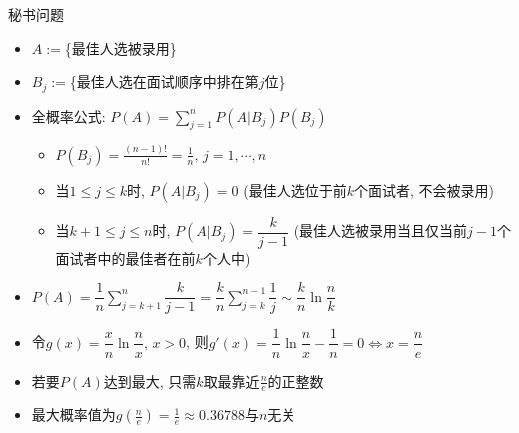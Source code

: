 \begin{frame}{秘书问题}
		\begin{itemize}[<+-|alert@+>]
			\item $A:=$\{最佳人选被录用\}%
			\item$B_j:=$\{最佳人选在面试顺序中排在第$j$位\}
			\item 全概率公式: $P(A)=\sum\limits_{j=1}^{n}P(A|B_j)P(B_j)$%
			\begin{itemize}[<+-|alert@+>]
			\item $P(B_j)=\frac{(n-1)!}{n!}=\frac{1}{n},\,j=1,\cdots,n$
			\item 当$1\leq j\leq k$时, $P(A|B_j)=0$ \pause (最佳人选位于前$k$个面试者, 不会被录用)\pause
			\item 当$k+1\leq j\leq n$时, $P(A|B_j)=\dfrac{k}{j-1}$ (最佳人选被录用当且仅当前$j-1$个面试者中的最佳者在前$k$个人中)
			\end{itemize}
			\item $P(A)=\dfrac{1}{n}\sum\limits_{j=k+1}^{n}\dfrac{k}{j-1}=\dfrac{k}{n}\sum\limits_{j=k}^{n-1}\dfrac{1}{j}\sim\dfrac{k}{n}\ln\dfrac{n}{k}$
			\item 令$g(x)=\dfrac{x}{n}\ln\dfrac{n}{x},\,x>0$, 则$g'(x)=\dfrac{1}{n}\ln\dfrac{n}{x}-\dfrac{1}{n}=0\Longleftrightarrow x=\dfrac{n}{e}$
			\item 若要$P(A)$达到最大, 只需$k$取最靠近$\frac{n}{e}$的正整数
			\item 最大概率值为$g\left(\frac{n}{e}\right)=\frac{1}{e}\approx 0.36788$与$n$无关
		\end{itemize}
\end{frame}









